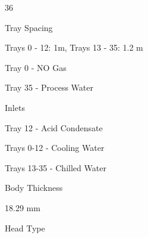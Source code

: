 \documentclass[a4paper,portrait,12pt]{article}
\begin{document}
36





\begin{flushleft}
Tray Spacing
\end{flushleft}





\begin{flushleft}
Trays 0 - 12: 1m, Trays 13 - 35: 1.2 m
\end{flushleft}


\begin{flushleft}
Tray 0 - NO Gas
\end{flushleft}


\begin{flushleft}
Tray 35 - Process Water
\end{flushleft}





\begin{flushleft}
Inlets
\end{flushleft}





\begin{flushleft}
Tray 12 - Acid Condensate
\end{flushleft}


\begin{flushleft}
Trays 0-12 - Cooling Water
\end{flushleft}


\begin{flushleft}
Trays 13-35 - Chilled Water
\end{flushleft}





\begin{flushleft}
Body Thickness
\end{flushleft}





\begin{flushleft}
18.29 mm
\end{flushleft}





\begin{flushleft}
Head Type
\end{flushleft}
\end{document}
